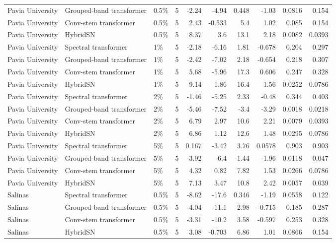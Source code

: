 \begin{table}
\begin{tabular}{lllrrrrrrr}
Pavia University & Grouped-band transformer & 0.5\% & 5 & -2.24 & -4.94 & 0.448 & -1.03 & 0.0816 & 0.154 \\
Pavia University & Conv-stem transformer & 0.5\% & 5 & 2.43 & -0.533 & 5.4 & 1.02 & 0.085 & 0.154 \\
Pavia University & HybridSN & 0.5\% & 5 & 8.37 & 3.6 & 13.1 & 2.18 & 0.0082 & 0.0393 \\
Pavia University & Spectral transformer & 1\% & 5 & -2.18 & -6.16 & 1.81 & -0.678 & 0.204 & 0.297 \\
Pavia University & Grouped-band transformer & 1\% & 5 & -2.42 & -7.02 & 2.18 & -0.654 & 0.218 & 0.307 \\
Pavia University & Conv-stem transformer & 1\% & 5 & 5.68 & -5.96 & 17.3 & 0.606 & 0.247 & 0.328 \\
Pavia University & HybridSN & 1\% & 5 & 9.14 & 1.86 & 16.4 & 1.56 & 0.0252 & 0.0786 \\
Pavia University & Spectral transformer & 2\% & 5 & -1.46 & -5.25 & 2.33 & -0.48 & 0.344 & 0.403 \\
Pavia University & Grouped-band transformer & 2\% & 5 & -5.46 & -7.52 & -3.4 & -3.29 & 0.0018 & 0.0218 \\
Pavia University & Conv-stem transformer & 2\% & 5 & 6.79 & 2.97 & 10.6 & 2.21 & 0.0079 & 0.0393 \\
Pavia University & HybridSN & 2\% & 5 & 6.86 & 1.12 & 12.6 & 1.48 & 0.0295 & 0.0786 \\
Pavia University & Spectral transformer & 5\% & 5 & 0.167 & -3.42 & 3.76 & 0.0578 & 0.903 & 0.903 \\
Pavia University & Grouped-band transformer & 5\% & 5 & -3.92 & -6.4 & -1.44 & -1.96 & 0.0118 & 0.047 \\
Pavia University & Conv-stem transformer & 5\% & 5 & 4.32 & 0.82 & 7.82 & 1.53 & 0.0266 & 0.0786 \\
Pavia University & HybridSN & 5\% & 5 & 7.13 & 3.47 & 10.8 & 2.42 & 0.0057 & 0.039 \\
Salinas & Spectral transformer & 0.5\% & 5 & -8.62 & -17.6 & 0.346 & -1.19 & 0.0558 & 0.122 \\
Salinas & Grouped-band transformer & 0.5\% & 5 & -4.04 & -11.1 & 2.98 & -0.715 & 0.185 & 0.287 \\
Salinas & Conv-stem transformer & 0.5\% & 5 & -3.31 & -10.2 & 3.58 & -0.597 & 0.253 & 0.328 \\
Salinas & HybridSN & 0.5\% & 5 & 3.08 & -0.703 & 6.86 & 1.01 & 0.0866 & 0.154 \\

\end{tabular}
\end{table}
